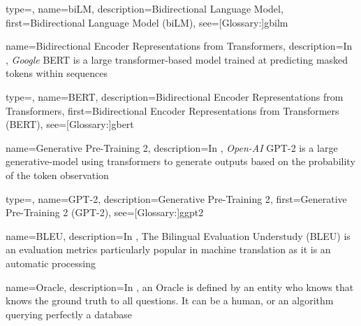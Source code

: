 {
  type=\acronymtype,
  name={biLM},
  description={Bidirectional Language Model},
  first={Bidirectional Language Model (biLM)},
  see=[Glossary:]{gbilm}
}

{
  name={Bidirectional Encoder Representations from Transformers},
  description={In , \textit{Google} BERT is a large \gls{transformer}-based model trained at predicting masked tokens within sequences}
}

{
  type=\acronymtype,
  name={BERT},
  description={Bidirectional Encoder Representations from Transformers},
  first={Bidirectional Encoder Representations from Transformers (BERT)},
  see=[Glossary:]{gbert}
}


{
  name={Generative Pre-Training 2},
  description={In , \textit{Open-AI} GPT-2 is a large \gls{generative-model} using \glspl{transformer} to generate outputs based on the probability of the token observation}
}

{
  type=\acronymtype,
  name={GPT-2},
  description={Generative Pre-Training 2},
  first={Generative Pre-Training 2 (GPT-2)},
  see=[Glossary:]{ggpt2}
}


{
  name={BLEU},
  description={In , The Bilingual Evaluation Understudy (BLEU) is an evaluation metrics particularly popular in machine translation as it is an automatic processing}
}

{
  name={Oracle},
  description={In , an Oracle is defined by an entity who knows that knows the ground truth to all questions. It can be a human, or an algorithm querying perfectly a database}
}



